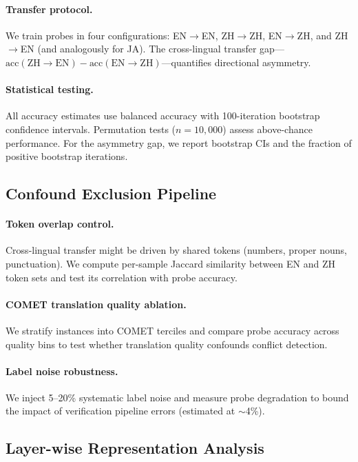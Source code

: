 \documentclass{article}
\begin{document}
\paragraph{Transfer protocol.}
We train probes in four configurations: EN$\to$EN, ZH$\to$ZH, EN$\to$ZH, and ZH$\to$EN (and analogously for JA). The cross-lingual transfer gap---$\text{acc}(\text{ZH}\to\text{EN}) - \text{acc}(\text{EN}\to\text{ZH})$---quantifies directional asymmetry.

\paragraph{Statistical testing.}
All accuracy estimates use balanced accuracy with 100-iteration bootstrap confidence intervals. Permutation tests ($n = 10{,}000$) assess above-chance performance. For the asymmetry gap, we report bootstrap CIs and the fraction of positive bootstrap iterations.

\subsection{Confound Exclusion Pipeline}

\paragraph{Token overlap control.}
Cross-lingual transfer might be driven by shared tokens (numbers, proper nouns, punctuation). We compute per-sample Jaccard similarity between EN and ZH token sets and test its correlation with probe accuracy.

\paragraph{COMET translation quality ablation.}
We stratify instances into COMET terciles and compare probe accuracy across quality bins to test whether translation quality confounds conflict detection.

\paragraph{Label noise robustness.}
We inject 5--20\% systematic label noise and measure probe degradation to bound the impact of verification pipeline errors (estimated at $\sim$4\%).

\subsection{Layer-wise Representation Analysis}
\end{document}
